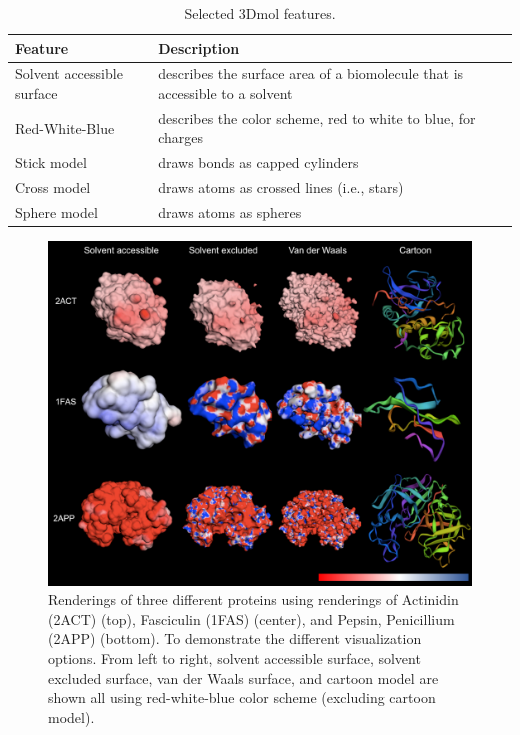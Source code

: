 \documentclass[journal=jpcbfk, manuscript=article]{achemso}
\begin{document}
\begin{table}
	\small
	\begin{center}
		\caption{Selected 3Dmol features.}
		\label{tab:table1}
		\begin{tabular}{l l}
			\toprule [0.3ex]
			Feature & Description\\
			\midrule
			Solvent accessible surface & describes the surface area of a biomolecule that is accessible to a solvent \\
			Red-White-Blue & describes the color scheme, red to white to blue, for charges \\
			Stick model & draws bonds as capped cylinders \\
			Cross model & draws atoms as crossed lines (i.e., stars) \\
			Sphere model & draws atoms as spheres \\
			\bottomrule [0.3ex]
		\end{tabular}
	\end{center}
\end{table}

\begin{figure}
	\begin{center}
		\includegraphics[width=.75\paperwidth]{features.png}
		\caption{\small Renderings of three different proteins using renderings of Actinidin (2ACT) (top), Fasciculin (1FAS) (center), and Pepsin, Penicillium (2APP) (bottom). To demonstrate the different  visualization options. From left to right, solvent accessible surface, solvent excluded surface, van der Waals  surface, and cartoon model are shown all using red-white-blue color scheme (excluding cartoon model). 
			\label{fig:features}}  
	\end{center}  
\end{figure}
\end{document}
